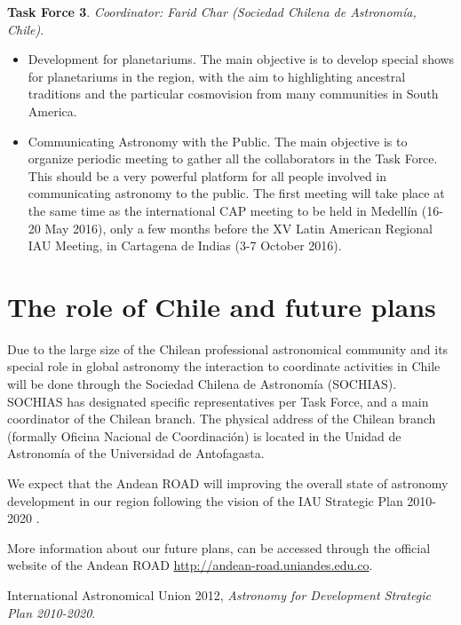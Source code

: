 \documentclass{iau_FM}
\begin{document}
\textbf{Task Force 3}. \textit{Coordinator: Farid Char (Sociedad Chilena de Astronom\'ia, Chile)}.

\begin{itemize}
\item Development for planetariums. The main objective is to develop
special shows for planetariums in the region, with the aim to
highlighting ancestral traditions and the particular cosmovision from
many communities in South America. 

\item Communicating Astronomy with the Public. The main objective is to
organize periodic meeting to gather all the collaborators in the Task
Force. This should be a very powerful platform for all people involved
in communicating astronomy to the public. The first meeting will take
place at the same time as the international CAP meeting to be held in
Medell\'in  (16-20 May 2016), only a few months before the 
XV Latin American Regional IAU Meeting, in Cartagena de Indias (3-7
October 2016). 
\end{itemize}

\section{The role of Chile and future plans}

Due to the large size of the Chilean professional astronomical
community and its special role in global astronomy the
interaction to coordinate activities in Chile will be done through the
Sociedad Chilena de Astronom\'ia (SOCHIAS).
SOCHIAS has designated specific representatives per Task Force, and a
main coordinator of the Chilean branch. 
The physical address of the Chilean branch (formally Oficina
Nacional de Coordinaci\'on) is located in the Unidad de Astronom\'ia
of the Universidad de Antofagasta. 

We expect that the Andean ROAD  will  improving the overall state of astronomy
development in our region following the vision of the  IAU Strategic
Plan 2010-2020 \cite[International Astronomical Union   (2012)]{IAU2012}.

More information about our future plans, can be accessed through the
official website of the Andean ROAD
\url{http://andean-road.uniandes.edu.co}.  


\begin{thebibliography}{}

{International Astronomical Union} 2012, 
\textit{Astronomy for Development Strategic Plan 2010-2020}.


\end{thebibliography}
\end{document}
